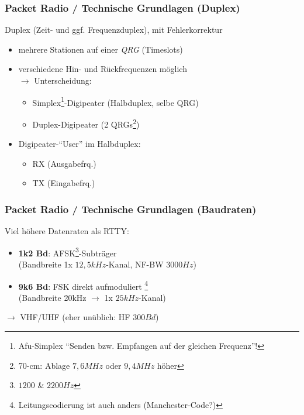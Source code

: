 \begin{frame}
    \frametitle{Packet Radio / Technische Grundlagen (Duplex)}

    Duplex (Zeit- und ggf. Frequenzduplex), mit Fehlerkorrektur

    \begin{itemize}
        \item mehrere Stationen auf einer \emph{QRG} (Timeslots)
        \item verschiedene Hin- und Rückfrequenzen möglich \\ $\rightarrow$
              Unterscheidung:
        \begin{itemize}
            \item Simplex\footnote{Afu-Simplex ``Senden bzw. Empfangen auf
                  der gleichen Frequenz''!}-Digipeater (Halbduplex, selbe QRG)
            \item Duplex-Digipeater (2 QRGs\footnote{70-cm: Ablage $7,6 MHz$
                  oder $9,4 MHz$ höher})
        \end{itemize}
        \item Digipeater-``User'' im Halbduplex:
        \begin{itemize}
            \item RX (Ausgabefrq.)
            \item TX (Eingabefrq.)
        \end{itemize}
    \end{itemize}

\end{frame}

\begin{frame}
    \frametitle{Packet Radio / Technische Grundlagen (Baudraten)}

    Viel höhere Datenraten als RTTY:

    \begin{itemize}
        \item \textbf{1k2 Bd}: AFSK\footnote{$1200$ \& $2200 Hz$}-Subträger \\
              (Bandbreite 1x $12,5kHz$-Kanal, NF-BW $3000 Hz$)
        \item \textbf{9k6 Bd}: FSK direkt aufmoduliert
              \footnote{Leitungscodierung ist auch anders (Manchester-Code?)} \\
              (Bandbreite 20kHz $\rightarrow$ 1x $25kHz$-Kanal)
    \end{itemize}

    $\rightarrow$ VHF/UHF (eher unüblich: HF $300 Bd$)

\end{frame}

